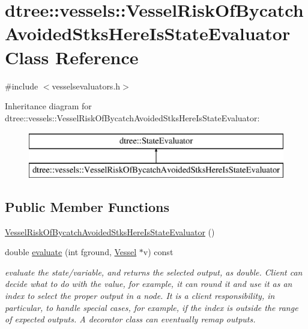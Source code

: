 \hypertarget{classdtree_1_1vessels_1_1_vessel_risk_of_bycatch_avoided_stks_here_is_state_evaluator}{}\section{dtree\+::vessels\+::Vessel\+Risk\+Of\+Bycatch\+Avoided\+Stks\+Here\+Is\+State\+Evaluator Class Reference}
\label{classdtree_1_1vessels_1_1_vessel_risk_of_bycatch_avoided_stks_here_is_state_evaluator}


{\ttfamily \#include $<$vesselsevaluators.\+h$>$}

Inheritance diagram for dtree\+::vessels\+::Vessel\+Risk\+Of\+Bycatch\+Avoided\+Stks\+Here\+Is\+State\+Evaluator\+:\begin{figure}[H]
\begin{center}
\leavevmode
\includegraphics[height=2.000000cm]{d7/dfc/classdtree_1_1vessels_1_1_vessel_risk_of_bycatch_avoided_stks_here_is_state_evaluator}
\end{center}
\end{figure}
\subsection*{Public Member Functions}
\begin{DoxyCompactItemize}
\item 
\mbox{\hyperlink{classdtree_1_1vessels_1_1_vessel_risk_of_bycatch_avoided_stks_here_is_state_evaluator_a8d1e1060c1fcf14e451e9102e35bcfde}{Vessel\+Risk\+Of\+Bycatch\+Avoided\+Stks\+Here\+Is\+State\+Evaluator}} ()
\item 
double \mbox{\hyperlink{classdtree_1_1vessels_1_1_vessel_risk_of_bycatch_avoided_stks_here_is_state_evaluator_a8b75337fe22382e6878459887b758116}{evaluate}} (int fground, \mbox{\hyperlink{class_vessel}{Vessel}} $\ast$v) const
\begin{DoxyCompactList}\small\item\em evaluate the state/variable, and returns the selected output, as double. Client can decide what to do with the value, for example, it can round it and use it as an index to select the proper output in a node. It is a client responsibility, in particular, to handle special cases, for example, if the index is outside the range of expected outputs. A decorator class can eventually remap outputs. \end{DoxyCompactList}\end{DoxyCompactItemize}


